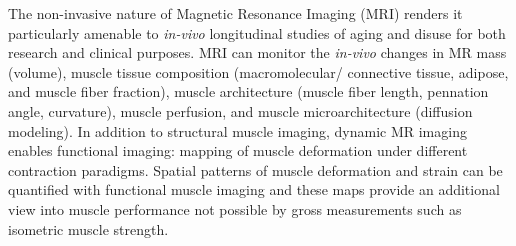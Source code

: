 The non-invasive nature of Magnetic Resonance Imaging (MRI) renders it particularly amenable to \textit{in-vivo} longitudinal studies of aging and disuse for both research and clinical purposes. 
MRI can monitor the \textit{in-vivo} changes in MR mass (volume), muscle tissue composition (macromolecular/ connective tissue, adipose, and muscle fiber fraction), muscle architecture (muscle fiber length, pennation angle, curvature), muscle perfusion, and muscle microarchitecture (diffusion modeling). 
In addition to structural muscle imaging, dynamic MR imaging enables functional imaging: mapping of muscle deformation under different contraction paradigms. 
Spatial patterns of muscle deformation and strain can be quantified with functional muscle imaging and these maps provide an additional view into muscle performance not possible by gross measurements such as isometric muscle strength. 

